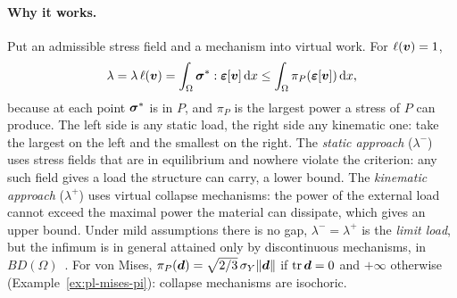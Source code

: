 \paragraph{Why it works.} Put an admissible stress field and a mechanism into
virtual work. For $\ell(\bm{v})=1$,
\[
  \lambda=\lambda\,\ell(\bm{v})=\int_\Omega\bm{\sigma}^\ast:\bm{\varepsilon}[\bm{v}]\,\mathrm{d} x\le\int_\Omega\pi_P(\bm{\varepsilon}[\bm{v}])\,\mathrm{d} x ,
\]
because at each point $\bm{\sigma}^\ast$ is in $P$, and $\pi_P$ is the largest power
a stress of $P$ can produce. The left side is any static load, the right side
any kinematic one: take the largest on the left and the smallest on the
right.
The \emph{static approach} ($\lambda^-$) uses stress fields that are in
equilibrium and nowhere violate the criterion: any such field gives a load the
structure can carry, a lower bound. The \emph{kinematic approach}
($\lambda^+$) uses virtual collapse mechanisms: the power of the external
load cannot exceed the maximal power the material can dissipate, which gives
an upper bound. Under mild assumptions there is no gap, $\lambda^-=\lambda^+$
is the \emph{limit load}, but the infimum is in general attained only by
discontinuous mechanisms, in $BD(\Omega)$~\cite{Temam1983}. For von Mises,
$\pi_P(\bm{d})=\sqrt{2/3}\,\sigma_{Y}\lVert \bm{d}\rVert$ if $\operatorname{tr}\bm{d}=0$ and $+\infty$
otherwise (Example~\ref{ex:pl-mises-pi}): collapse mechanisms are isochoric.

